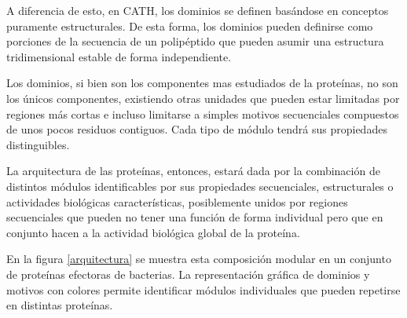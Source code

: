 A diferencia de esto, en CATH\cite{orengo1997cath}, los dominios se definen basándose en conceptos puramente estructurales. 
De esta forma, los dominios pueden definirse como porciones de la secuencia de un polipéptido que pueden asumir una estructura tridimensional estable de forma independiente. 

Los dominios, si bien son los componentes mas estudiados de la proteínas, no son los únicos componentes, existiendo otras unidades que pueden estar 
limitadas por regiones más cortas e incluso limitarse a simples motivos secuenciales compuestos de unos pocos residuos contiguos.
Cada tipo de módulo tendrá sus propiedades distinguibles.

La arquitectura de las proteínas, entonces, estará dada por la combinación de distintos módulos identificables por sus propiedades secuenciales, estructurales o actividades biológicas características, 
posiblemente unidos por regiones secuenciales que pueden no tener una función de forma individual pero que en conjunto hacen a la actividad biológica global de la proteína.

En la figura \ref{arquitectura} se muestra esta composición modular en un conjunto de proteínas efectoras de bacterias.
La representación gráfica de dominios y motivos con colores permite identificar módulos individuales que pueden repetirse en distintas proteínas.

